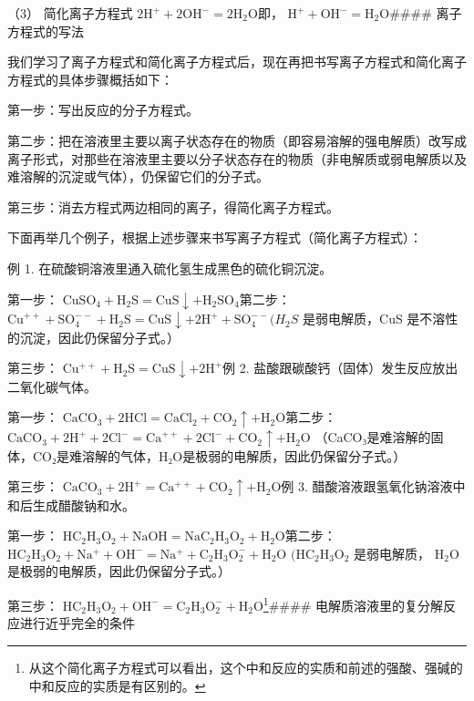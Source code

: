 （3） 简化离子方程式
\(2 \mathrm{H}^{+} + 2 \mathrm{OH}^{-} = 2 \mathrm{H}_{2} \mathrm{O}\)即，
\(\mathrm{H}^{+} + \mathrm{OH}^{-} = \mathrm{H}_{2}\mathrm{O}\)\#\#\#\#
离子方程式的写法

我们学习了离子方程式和简化离子方程式后，现在再把书写离子方程式和简化离子方程式的具体步骤概括如下：

第一步：写出反应的分子方程式。

第二步：把在溶液里主要以离子状态存在的物质（即容易溶解的强电解质）改写成离子形式，对那些在溶液里主要以分子状态存在的物质（非电解质或弱电解质以及难溶解的沉淀或气体），仍保留它们的分子式。

第三步：消去方程式两边相同的离子，得简化离子方程式。

下面再举几个例子，根据上述步骤来书写离子方程式（简化离子方程式）：

例 1. 在硫酸铜溶液里通入硫化氢生成黑色的硫化铜沉淀。

第一步： \(\mathrm{CuSO_4 + H_2S = CuS\downarrow + H_2SO_4}\)第二步：
\(\mathrm{Cu}^{++} + \mathrm{SO}_4^{--} + \mathrm{H}_2\mathrm{S} = \mathrm{CuS}\downarrow +2\mathrm{H}^+ +\mathrm{SO}_4^{--}\)\((H_{2}S\)
是弱电解质，CuS 是不溶性的沉淀，因此仍保留分子式。）

第三步： \(\mathrm{Cu^{++} + H_2S = CuS\downarrow + 2H^+}\)例 2.
盐酸跟碳酸钙（固体）发生反应放出二氧化碳气体。

第一步：
\(\mathrm{CaCO_3 + 2HCl = CaCl_2 + CO_2\uparrow + H_2O}\)第二步：
\(\mathrm{CaCO}_{3} + 2\mathrm{H}^{+} + 2\mathrm{Cl}^{-} = \mathrm{Ca}^{++} + 2\mathrm{Cl}^{-} + \mathrm{CO}_{2}\uparrow + \mathrm{H}_{2}\mathrm{O}\)
（CaCO₃是难溶解的固体，CO₂是难溶解的气体，H₂O是极弱的电解质，因此仍保留分子式。）

第三步： \(\mathrm{CaCO_3 + 2H^+ = Ca^{++} + CO_2\uparrow + H_2O}\)例 3.
醋酸溶液跟氢氧化钠溶液中和后生成醋酸钠和水。

第一步：
\(\mathrm{HC}_2\mathrm{H}_3\mathrm{O}_2 + \mathrm{NaOH} = \mathrm{NaC}_2\mathrm{H}_3\mathrm{O}_2 + \mathrm{H}_2\mathrm{O}\)第二步：
\(\mathrm{HC_2H_3O_2 + Na^+ + OH^- = Na^+ + C_2H_3O_2^- + H_2O}\)
\((\mathrm{HC}_2\mathrm{H}_3\mathrm{O}_2\) 是弱电解质，
\(\mathrm{H}_2\mathrm{O}\) 是极弱的电解质，因此仍保留分子式。）

第三步：
\(\mathrm{HC}_2\mathrm{H}_3\mathrm{O}_2 + \mathrm{OH}^- = \mathrm{C}_2\mathrm{H}_3\mathrm{O}_2^- +\mathrm{H}_2\mathrm{O}\)\footnote{从这个简化离子方程式可以看出，这个中和反应的实质和前述的强酸、强碱的中和反应的实质是有区别的。}\#\#\#\#
电解质溶液里的复分解反应进行近乎完全的条件

